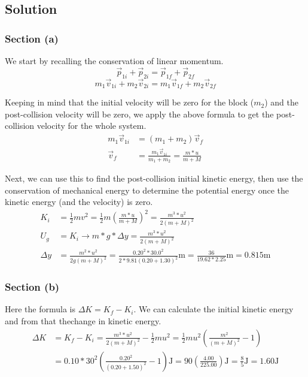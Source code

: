 \documentclass[12pt]{article}
\begin{document}
\subsection*{Solution}
\subsubsection*{Section (a)}
We start by recalling the conservation of linear momentum.
\[ \vec{p}_{1i} + \vec{p}_{2i} = \vec{p}_{1f} + \vec{p}_{2f} \]
\[ m_1\vec{v}_{1i} + m_2\vec{v}_{2i} = m_1\vec{v}_{1f} + m_2\vec{v}_{2f} \]

Keeping in mind that the initial velocity will be zero for the block ($m_2$) and the post-collision velocity will be zero, we apply the above formula to get the post-collision velocity for the whole system.
\begin{align*}
    m_1\vec{v}_{1i} &=  (m_1 + m_2)\vec{v}_{f}\\
    \vec{v}_{f} &=  \frac{m_1\vec{v}_{1i}}{m_1 + m_2} = \frac{m*u}{m+M}
\end{align*}

Next, we can use this to find the post-collision initial kinetic energy, then use the conservation of mechanical energy to determine the potential energy once the kinetic energy (and the velocity) is zero.
\begin{align*}
    K_i &=  \frac{1}{2}mv^2
        =   \frac{1}{2}m\left(\frac{m*u}{m+M}\right)^2
        =   \frac{m^3*u^2}{2(m+M)^2}\\
    U_g &=  K_i\rightarrow
    m*g*\Delta y    =  \frac{m^3*u^2}{2(m+M)^2}\\
    \Delta y    &=  \frac{m^2*u^2}{2g(m+M)^2}
        =   \frac{0.20^2*30.0^2}{2*9.81(0.20+1.30)^2}\unit{\meter}
        =   \frac{36}{19.62*2.25}\unit{\meter}
        =   \boxed{0.815\unit{\meter}}
\end{align*}

\pagebreak
\subsubsection*{Section (b)}
Here the formula is \( \Delta K = K_f - K_i \). We can calculate the initial kinetic energy and from that thechange in kinetic energy.
\begin{align*}
    \Delta K    &=  K_f - K_i
        =   \frac{m^3*u^2}{2(m+M)^2} - \frac{1}{2}mu^2
        =   \frac{1}{2}mu^2\left(\frac{m^2}{(m+M)^2} - 1\right)\\
        &=  0.10*30^2\left(\frac{0.20^2}{(0.20+1.50)^2} - 1\right) \unit{\joule}
        =   90\left(\frac{4.00}{225.00}\right) \unit{\joule}
        =   \boxed{\frac{8}{5} \unit{\joule} = 1.60 \unit{\joule}}
\end{align*}
\end{document}
